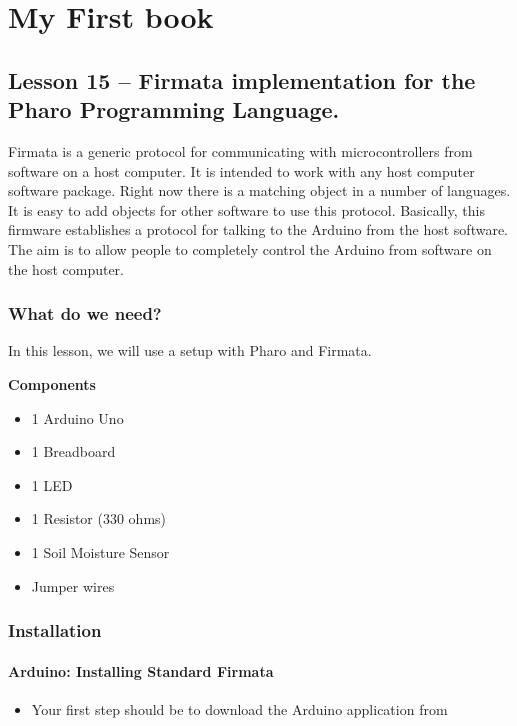\documentclass[10pt,twoside,english]{_support/latex/sbabook/sbabook}
\begin{document}
\frontmatter
\pagestyle{plain}

\tableofcontents*
\clearpage\listoffigures

\mainmatter

\part{My First book}\chapter{Lesson 15 –  Firmata implementation for the Pharo Programming Language.}
Firmata is a generic protocol for communicating with microcontrollers from software on a host computer. 
It is intended to work with any host computer software package. Right now there is a matching object in a number of languages. 
It is easy to add objects for other software to use this protocol. 
Basically, this firmware establishes a protocol for talking to the Arduino from the host software. 
The aim is to allow people to completely control the Arduino from software on the host computer.
\section{What do we need?}
In this lesson, we will use a setup with Pharo and Firmata.

\textbf{Components}

\begin{itemize}
\item 1 Arduino Uno
\item 1 Breadboard
\item 1 LED
\item 1 Resistor (330 ohms)
\item 1 Soil Moisture Sensor
\item Jumper wires
\end{itemize}
\section{Installation}\subsection{Arduino: Installing Standard Firmata}
\begin{itemize}
\item Your first step should be to download the Arduino application from 
\end{itemize}
\end{document}
